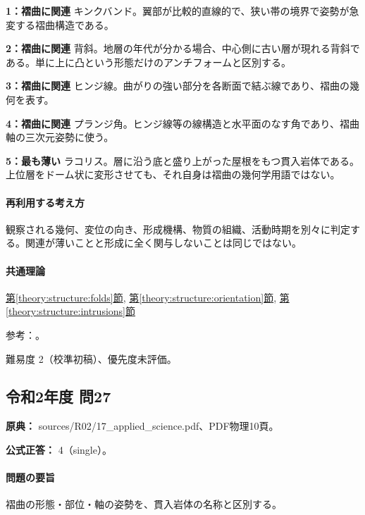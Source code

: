 \noindent\textbf{1：褶曲に関連} キンクバンド。翼部が比較的直線的で、狭い帯の境界で姿勢が急変する褶曲構造である。\par

\noindent\textbf{2：褶曲に関連} 背斜。地層の年代が分かる場合、中心側に古い層が現れる背斜である。単に上に凸という形態だけのアンチフォームと区別する。\par

\noindent\textbf{3：褶曲に関連} ヒンジ線。曲がりの強い部分を各断面で結ぶ線であり、褶曲の幾何を表す。\par

\noindent\textbf{4：褶曲に関連} プランジ角。ヒンジ線等の線構造と水平面のなす角であり、褶曲軸の三次元姿勢に使う。\par

\noindent\textbf{5：最も薄い} ラコリス。層に沿う底と盛り上がった屋根をもつ貫入岩体である。上位層をドーム状に変形させても、それ自身は褶曲の幾何学用語ではない。\par

\paragraph{再利用する考え方} 観察される幾何、変位の向き、形成機構、物質の組織、活動時期を別々に判定する。関連が薄いことと形成に全く関与しないことは同じではない。

\paragraph{共通理論} \hyperref[theory:structure:folds]{第\ref*{theory:structure:folds}節}, \hyperref[theory:structure:orientation]{第\ref*{theory:structure:orientation}節}, \hyperref[theory:structure:intrusions]{第\ref*{theory:structure:intrusions}節}

\par 参考：\cite{str_intrusion,str_fold}。

\par 難易度 2（校準初稿）、優先度未評価。

\subsection{令和2年度 問27}
\label{q:r02-reg-applied-27}

\noindent\textbf{原典：} sources/R02/17\_applied\_science.pdf、PDF物理10頁。

\textbf{公式正答：} 4（single）。

\paragraph{問題の要旨} 褶曲の形態・部位・軸の姿勢を、貫入岩体の名称と区別する。

